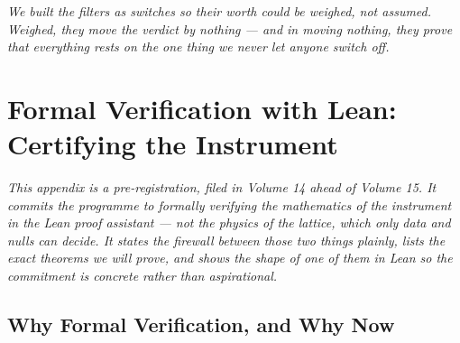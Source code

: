\documentclass[11pt, letterpaper, openany]{book}
\begin{document}
\begin{center}
\vspace{0.5em}
\itshape
We built the filters as switches so their worth could be weighed, not assumed. Weighed, they move the
verdict by nothing --- and in moving nothing, they prove that everything rests on the one thing we never
let anyone switch off.
\vspace{0.5em}
\end{center}


\chapter{Formal Verification with Lean: Certifying the Instrument}

\begin{center}
\textit{This appendix is a pre-registration, filed in Volume 14 ahead of Volume 15. It commits the
programme to formally verifying the \emph{mathematics of the instrument} in the Lean proof
assistant --- not the physics of the lattice, which only data and nulls can decide. It states the
firewall between those two things plainly, lists the exact theorems we will prove, and shows the
shape of one of them in Lean so the commitment is concrete rather than aspirational.}
\end{center}


\section{Why Formal Verification, and Why Now}
\end{document}
